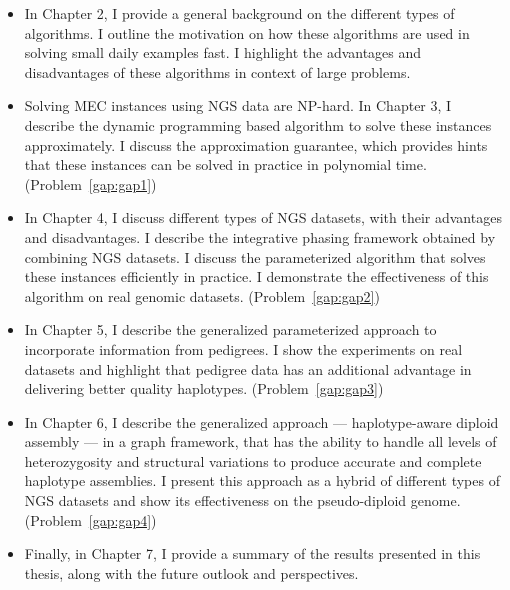 \begin{itemize}
 \item In Chapter 2, I provide a general background on the different types of algorithms. I outline the motivation on how these algorithms are used in solving small daily examples fast. 
 I highlight the advantages and disadvantages of these algorithms in context of large problems.
 \item Solving MEC instances using NGS data are NP-hard. In Chapter 3, I describe the dynamic programming based algorithm to solve these instances approximately.
 I discuss the approximation guarantee, which provides hints that these instances can be solved in practice in polynomial time. (Problem~\ref{gap:gap1})
  \item In Chapter 4, I discuss different types of NGS datasets, with their advantages and disadvantages. I describe the integrative phasing framework obtained by combining NGS datasets. I discuss the parameterized algorithm that solves these instances efficiently in practice. 
  I demonstrate the effectiveness of this algorithm on real genomic datasets. (Problem~\ref{gap:gap2})
 \item In Chapter 5, I describe the generalized parameterized approach to incorporate information from pedigrees. I show the experiments on real datasets and highlight that pedigree data has an additional advantage in delivering better quality haplotypes. (Problem~\ref{gap:gap3})
 \item In Chapter 6, I describe the generalized approach --- haplotype-aware diploid assembly --- in a graph framework, that has the ability to handle all levels of heterozygosity and structural variations to produce accurate and complete haplotype assemblies.
 I present this approach as a hybrid of different types of NGS datasets and show its effectiveness on the pseudo-diploid genome. (Problem~\ref{gap:gap4})
 \item Finally, in Chapter 7, I provide a summary of the results presented in this thesis, along with the future outlook and perspectives.
\end{itemize}

